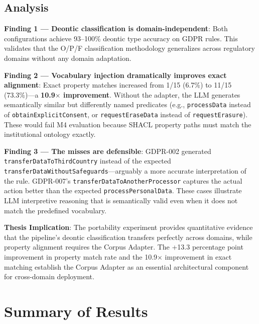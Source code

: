 \subsection{Analysis}

\textbf{Finding 1 --- Deontic classification is domain-independent}: Both configurations achieve 93--100\% deontic type accuracy on GDPR rules. This validates that the O/P/F classification methodology generalizes across regulatory domains without any domain adaptation.

\textbf{Finding 2 --- Vocabulary injection dramatically improves exact alignment}: Exact property matches increased from 1/15 (6.7\%) to 11/15 (73.3\%)---a \textbf{10.9$\times$ improvement}. Without the adapter, the LLM generates semantically similar but differently named predicates (e.g., \texttt{processData} instead of \texttt{obtainExplicitConsent}, or \texttt{requestEraseData} instead of \texttt{requestErasure}). These would fail M4 evaluation because SHACL property paths must match the institutional ontology exactly.

\textbf{Finding 3 --- The misses are defensible}: GDPR-002 generated \texttt{transferDataToThirdCountry} instead of the expected \texttt{transferDataWithoutSafeguards}---arguably a more accurate interpretation of the rule. GDPR-007's \texttt{transferDataToAnotherProcessor} captures the actual action better than the expected \texttt{processPersonalData}. These cases illustrate LLM interpretive reasoning that is semantically valid even when it does not match the predefined vocabulary.

\textbf{Thesis Implication}: The portability experiment provides quantitative evidence that the pipeline's deontic classification transfers perfectly across domains, while property alignment requires the Corpus Adapter. The +13.3 percentage point improvement in property match rate and the 10.9$\times$ improvement in exact matching establish the Corpus Adapter as an essential architectural component for cross-domain deployment.

\section{Summary of Results}

